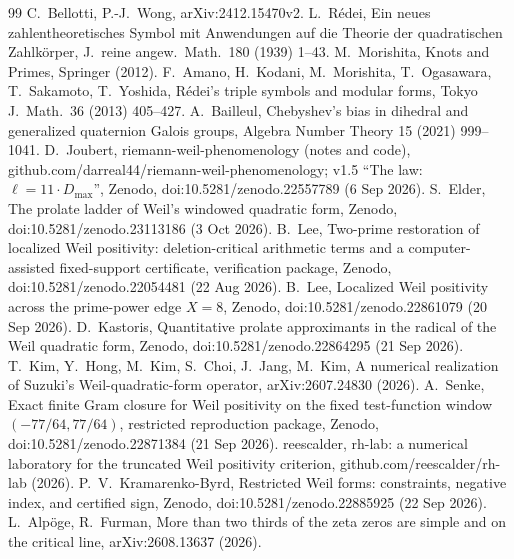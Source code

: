 \documentclass[11pt]{article}
\theoremstyle{remark}
\begin{document}
\begin{thebibliography}{99}
 C.~Bellotti, P.-J.~Wong, arXiv:2412.15470v2.
 L.~Rédei, Ein neues zahlentheoretisches Symbol mit Anwendungen auf die Theorie der quadratischen Zahlkörper, J.\ reine angew.\ Math.\ 180 (1939) 1--43.
 M.~Morishita, Knots and Primes, Springer (2012).
 F.~Amano, H.~Kodani, M.~Morishita, T.~Ogasawara, T.~Sakamoto, T.~Yoshida, Rédei's triple symbols and modular forms, Tokyo J.\ Math.\ 36 (2013) 405--427.
 A.~Bailleul, Chebyshev's bias in dihedral and generalized quaternion Galois groups, Algebra Number Theory 15 (2021) 999--1041.
 D.~Joubert, riemann-weil-phenomenology (notes and code), github.com/darreal44/riemann-weil-phenomenology; v1.5 ``The law: $\ell=11\cdot D_{\max}$'', Zenodo, doi:10.5281/zenodo.22557789 (6 Sep 2026).
 S.~Elder, The prolate ladder of Weil's windowed quadratic form, Zenodo, doi:10.5281/zenodo.23113186 (3 Oct 2026).
 B.~Lee, Two-prime restoration of localized Weil positivity: deletion-critical arithmetic terms and a computer-assisted fixed-support certificate, verification package, Zenodo, doi:10.5281/zenodo.22054481 (22 Aug 2026).
 B.~Lee, Localized Weil positivity across the prime-power edge $X=8$, Zenodo, doi:10.5281/zenodo.22861079 (20 Sep 2026).
 D.~Kastoris, Quantitative prolate approximants in the radical of the Weil quadratic form, Zenodo, doi:10.5281/zenodo.22864295 (21 Sep 2026).
 T.~Kim, Y.~Hong, M.~Kim, S.~Choi, J.~Jang, M.~Kim, A numerical realization of Suzuki's Weil-quadratic-form operator, arXiv:2607.24830 (2026).
 A.~Senke, Exact finite Gram closure for Weil positivity on the fixed test-function window $(-77/64,77/64)$, restricted reproduction package, Zenodo, doi:10.5281/zenodo.22871384 (21 Sep 2026).
 reescalder, rh-lab: a numerical laboratory for the truncated Weil positivity criterion, github.com/reescalder/rh-lab (2026).
 P.~V.~Kramarenko-Byrd, Restricted Weil forms: constraints, negative index, and certified sign, Zenodo, doi:10.5281/zenodo.22885925 (22 Sep 2026).
 L.~Alpöge, R.~Furman, More than two thirds of the zeta zeros are simple and on the critical line, arXiv:2608.13637 (2026).
\end{thebibliography}
\end{document}
